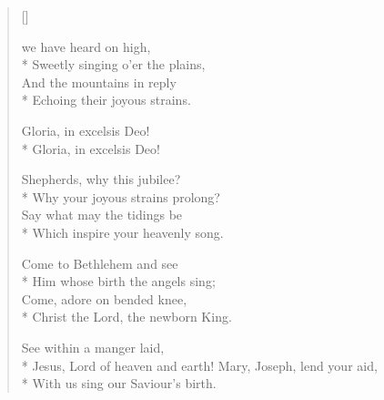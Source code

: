 \newHymn
{}

\begin{verse}[\versewidth]
\begin{altverse}
 we have heard on high,\\*
Sweetly singing o'er the plains,\\
And the mountains in reply\\*
Echoing their joyous strains.
\end{altverse}

\begin{indentedVerse}
 \vin Gloria, in excelsis Deo!\\*
\vin Gloria, in excelsis Deo!
\end{indentedVerse}

\begin{altverse}
 Shepherds, why this jubilee?\\*
Why your joyous strains prolong?\\
Say what may the tidings be\\*
Which inspire your heavenly song.
\end{altverse}

\begin{altverse}
 Come to Bethlehem and see\\*
Him whose birth the angels sing;\\
Come, adore on bended knee,\\*
Christ the Lord, the newborn King.
\end{altverse}

\begin{altverse}
 See within a manger laid,\\*
Jesus, Lord of heaven and earth!
Mary, Joseph, lend your aid,\\*
With us sing our Saviour's birth.
\end{altverse}

\end{verse}



